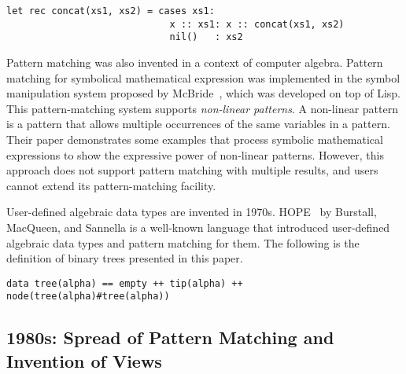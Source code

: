 \documentclass{article}
\begin{document}
\begin{lstlisting}[language=egison]
let rec concat(xs1, xs2) = cases xs1:
                             x :: xs1: x :: concat(xs1, xs2)
                             nil()   : xs2
\end{lstlisting}

Pattern matching was also invented in a context of computer algebra.
Pattern matching for symbolical mathematical expression was implemented in the symbol manipulation system proposed by McBride~\cite{mcbride1969symbol}, which was developed on top of Lisp.
This pattern-matching system supports \emph{non-linear patterns}.
A non-linear pattern is a pattern that allows multiple occurrences of the same variables in a pattern.
Their paper demonstrates some examples that process symbolic mathematical expressions to show the expressive power of non-linear patterns.
However, this approach does not support pattern matching with multiple results, and users cannot extend its pattern-matching facility.

User-defined algebraic data types are invented in 1970s.
HOPE~\cite{burstall1980hope} by Burstall, MacQueen, and Sannella is a well-known language that introduced user-defined algebraic data types and pattern matching for them.
The following is the definition of binary trees presented in this paper.

\begin{lstlisting}[language=egison]
data tree(alpha) == empty ++ tip(alpha) ++ node(tree(alpha)#tree(alpha))
\end{lstlisting}


\subsection{1980s: Spread of Pattern Matching and Invention of Views}
\end{document}
